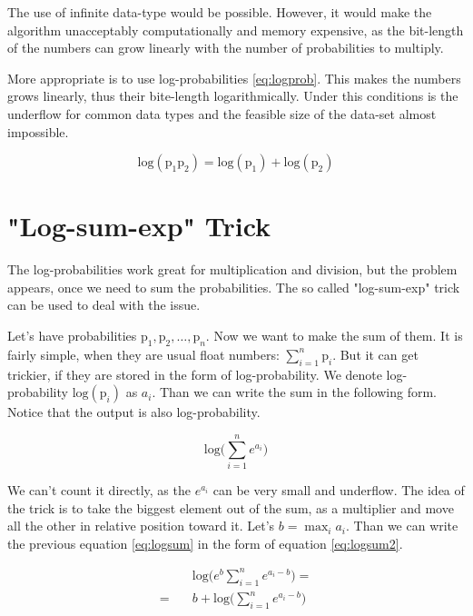 \documentclass[thesis=M,english]{FITthesis}[2012/10/20]
\begin{document}
The use of infinite data-type would be possible. However, it would make the algorithm unacceptably computationally and memory expensive, as the bit-length of the numbers can grow linearly with the number of probabilities to multiply.

More appropriate is to use log-probabilities \eqref{eq:logprob}. This makes the numbers grows linearly, thus their bite-length logarithmically. Under this conditions is the underflow for common data types and the feasible size of the data-set almost impossible.

\begin{equation}\label{eq:logprob}
\mathrm{log}(\mathrm{p}_1\mathrm{p}_2) = \mathrm{log}(\mathrm{p}_1) + \mathrm{log}(\mathrm{p}_2)
\end{equation}   

\section{"Log-sum-exp" Trick}

The log-probabilities work great for multiplication and division, but the problem appears, once we need to sum the probabilities. The so called "log-sum-exp" trick can be used to deal with the issue. 

Let's have probabilities $ \mathrm{p}_1, \mathrm{p}_2, \dots ,\mathrm{p}_n $. Now we want to make the sum of them. It is fairly simple, when they are usual float numbers: $\sum_{i=1}^n \mathrm{p}_i$. But it can get trickier, if they are stored in the form of log-probability. We denote log-probability $\mathrm{log}( \mathrm{p}_i )$ as $a_i$. Than we can write the sum in the following form. Notice that the output is also log-probability.

\begin{equation}\label{eq:logsum}
\mathrm{log} \big( \sum_{i=1}^n e^{a_i} \big)
\end{equation}

We can't count it directly, as the $e^{a_i}$ can be very small and underflow. The idea of the trick is to take the biggest element out of the sum, as a multiplier and move all the other in relative position toward it.
Let's $b = \max_{i} a_i$. Than we can write the previous equation \eqref{eq:logsum} in the form of equation \eqref{eq:logsum2}. 

\begin{equation}\label{eq:logsum2}
\begin{aligned}
&\mathrm{log} \big( e^b \sum_{i=1}^n e^{a_i - b } \big) = \\
 = \quad &  b + \mathrm{log} \big( \sum_{i=1}^n e^{a_i - b } \big)
\end{aligned}
\end{equation}
\end{document}

